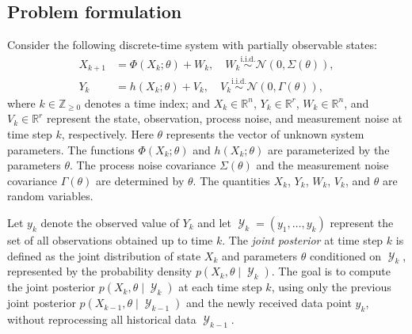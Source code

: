 \documentclass[preprint,3p,times]{elsarticle}
\DeclareMathOperator{\Y}{\mathcal{Y}}
\newcommand{\reals}{\mathbb{R}}
\newcommand{\pdense}{p}
\begin{document}
\subsection{Problem formulation}
\label{sec:problem}
Consider the following discrete-time system with partially observable states:
\begin{equation}\label{sys:general}
\begin{split}
X_{k+1} &= \Phi(X_k;\theta)+W_k, \quad W_k \overset{\mathrm{i.i.d.}}{\sim} \mathcal{N}(0,\Sigma(\theta)), \\
Y_k &= h(X_k;\theta)+V_k, \quad V_k \overset{\mathrm{i.i.d.}}{\sim} \mathcal{N}(0,\Gamma(\theta)),
\end{split}
\end{equation}
where $k \in \mathbb{Z}_{\geq 0}$ denotes a time index; and $X_k \in \reals^n$, $Y_k \in \reals^r$, $W_k \in \reals^n$, and $V_k \in \reals^r$ represent the state, observation, process noise, and measurement noise at time step $k$, respectively. Here $\theta$ represents the vector of unknown system parameters. The functions $\Phi(X_k;\theta)$ and $h(X_k;\theta)$ are parameterized by the parameters $\theta$. The process noise covariance $\Sigma(\theta)$ and the measurement noise covariance $\Gamma(\theta)$ are determined by $\theta$. The quantities $X_k$, $Y_k$, $W_k$, $V_k$, and $\theta$ are random variables.

Let $y_k$ denote the observed value of $Y_k$ and let $\Y_k = (y_1,\ldots,y_k)$ represent the set of all observations obtained up to time $k$. The \textit{joint posterior} at time step $k$ is defined as the joint distribution of state $X_k$ and parameters $\theta$ conditioned on $\Y_k$, represented by the probability density $\pdense(X_k,\theta \mid \Y_k)$. The goal is to compute the joint posterior $\pdense(X_k,\theta \mid \Y_k)$ at each time step $k$, using only the previous joint posterior $\pdense(X_{k-1},\theta \mid \Y_{k-1})$ and the newly received data point $y_k$, without reprocessing all historical data $\Y_{k-1}$. 
\end{document}
